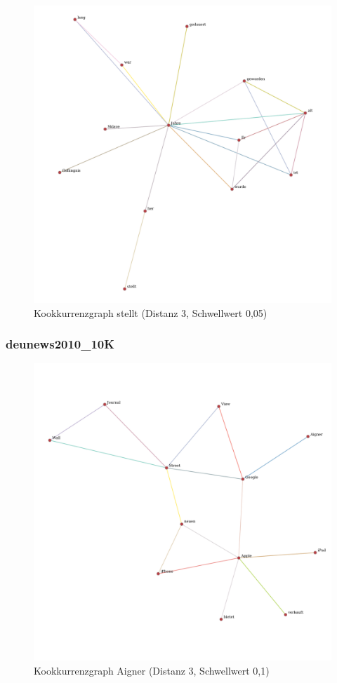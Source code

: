 \documentclass[11pt, a4paper]{article}
\begin{document}
\begin{figure}[hp!]
    \centering
        \includegraphics[scale=.4]{../../data/results/longpath_wordgraphs/nl/graph_stellt.pdf}
    \caption{Kookkurrenzgraph stellt (Distanz 3, Schwellwert 0,05)}
    \label{fig:lp-stellt}
\end{figure}


\pagebreak
\subsubsection{deunews2010\_10K}

\begin{figure}[hp!]
    \centering
        \includegraphics[scale=.4]{../../data/results/longpath_wordgraphs/den/graph_Aigner.pdf}
    \caption{Kookkurrenzgraph Aigner (Distanz 3, Schwellwert 0,1)}
    \label{fig:lp-aigner}
\end{figure}
\end{document}
